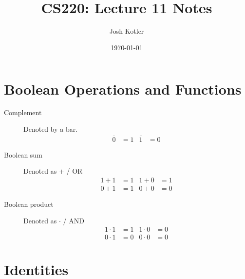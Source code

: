 \documentclass{article}
\title{CS220: Lecture 11 Notes}
\author{Josh Kotler}
\date{\today}
\begin{document}
    \maketitle
    \section{Boolean Operations and Functions}
    \begin{description}
        \item[Complement] Denoted by a bar.
            \begin{align*}
                \overline{0} &= 1   &   \overline{1} &= 0
            \end{align*}
        \item[Boolean sum] Denoted as $+$ / $\text{OR}$
            \begin{align*}
                1 + 1 &= 1   &   1 + 0 &= 1   \\
                0 + 1 &= 1   &   0 + 0 &= 0
            \end{align*}
        \item[Boolean product] Denoted as $\cdot$ / $\text{AND}$
            \begin{align*}
                1 \cdot 1 &= 1   &   1 \cdot 0 &= 0   \\
                0 \cdot 1 &= 0   &   0 \cdot 0 &= 0
            \end{align*}
    \end{description}
    \section{Identities}
\end{document}
